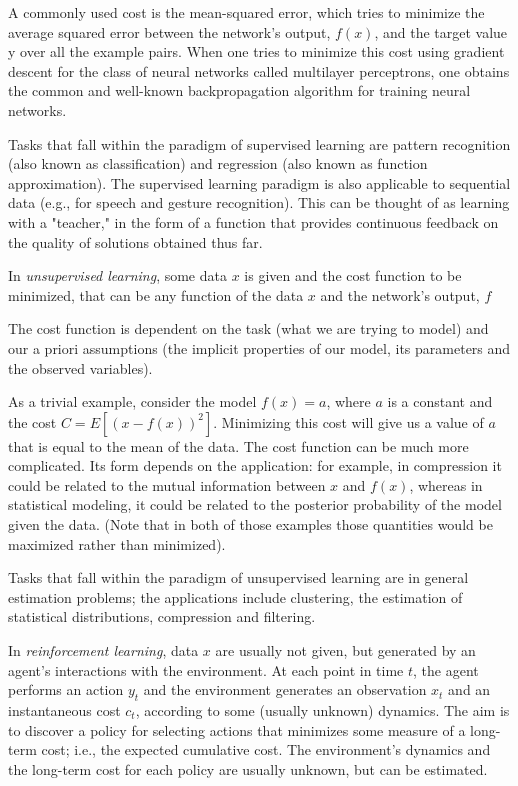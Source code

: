 \documentclass[a4paper,12pt]{article}
\begin{document}
A commonly used cost is the mean-squared error, which tries to minimize the average squared error between the network's output, $f(x)$, and the target value y over all the example pairs. When one tries to minimize this cost using gradient descent for the class of neural networks called multilayer perceptrons, one obtains the common and well-known backpropagation algorithm for training neural networks.

Tasks that fall within the paradigm of supervised learning are pattern recognition (also known as classification) and regression (also known as function approximation). The supervised learning paradigm is also applicable to sequential data (e.g., for speech and gesture recognition). This can be thought of as learning with a "teacher," in the form of a function that provides continuous feedback on the quality of solutions obtained thus far.

In \emph{unsupervised learning}, some data $ x $ is given and the cost function to be minimized, that can be any function of the data $ x $ and the network's output, $f$

The cost function is dependent on the task (what we are trying to model) and our a priori assumptions (the implicit properties of our model, its parameters and the observed variables).

As a trivial example, consider the model $f(x) = a$, where $ a $ is a constant and the cost $ C=E[(x - f(x))^2] $. Minimizing this cost will give us a value of $ a $ that is equal to the mean of the data. The cost function can be much more complicated. Its form depends on the application: for example, in compression it could be related to the mutual information between $ x $ and $ f(x) $, whereas in statistical modeling, it could be related to the posterior probability of the model given the data. (Note that in both of those examples those quantities would be maximized rather than minimized).

Tasks that fall within the paradigm of unsupervised learning are in general estimation problems; the applications include clustering, the estimation of statistical distributions, compression and filtering.

In \emph{reinforcement learning}, data $ x $ are usually not given, but generated by an agent's interactions with the environment. At each point in time $ t $, the agent performs an action $ y_t  $ and the environment generates an observation $ x_t $ and an instantaneous cost $ c_t $, according to some (usually unknown) dynamics. The aim is to discover a policy for selecting actions that minimizes some measure of a long-term cost; i.e., the expected cumulative cost. The environment's dynamics and the long-term cost for each policy are usually unknown, but can be estimated.
\end{document}
